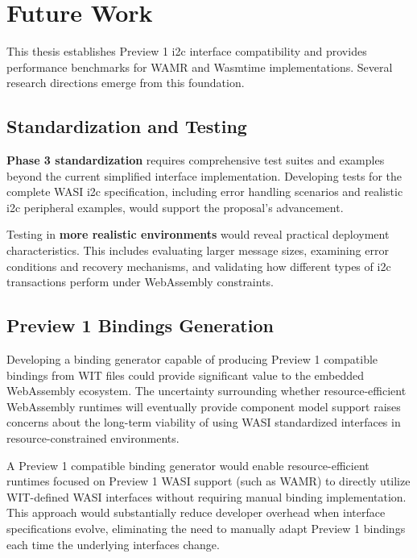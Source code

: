 \chapter*{Future Work}
\label{chap:future-work}

This thesis establishes Preview 1 \acrshort{i2c} interface compatibility and provides performance benchmarks for WAMR and Wasmtime implementations. Several research directions emerge from this foundation.

\section*{Standardization and Testing}
\label{sec:standardization-testing}

\textbf{Phase 3 standardization} requires comprehensive test suites and examples beyond the current simplified interface implementation. Developing tests for the complete WASI \acrshort{i2c} specification, including error handling scenarios and realistic \acrshort{i2c} peripheral examples, would support the proposal's advancement.

Testing in \textbf{more realistic environments} would reveal practical deployment characteristics. This includes evaluating larger message sizes, examining error conditions and recovery mechanisms, and validating how different types of \acrshort{i2c} transactions perform under WebAssembly constraints.

\section*{Preview 1 Bindings Generation}
\label{sec:fw-p1-bindgen}

Developing a binding generator capable of producing Preview 1 compatible bindings from WIT files could provide significant value to the embedded WebAssembly ecosystem. The uncertainty surrounding whether resource-efficient WebAssembly runtimes will eventually provide component model support raises concerns about the long-term viability of using WASI standardized interfaces in resource-constrained environments.

A Preview 1 compatible binding generator would enable resource-efficient runtimes focused on Preview 1 WASI support (such as WAMR) to directly utilize WIT-defined WASI interfaces without requiring manual binding implementation. This approach would substantially reduce developer overhead when interface specifications evolve, eliminating the need to manually adapt Preview 1 bindings each time the underlying interfaces change.

